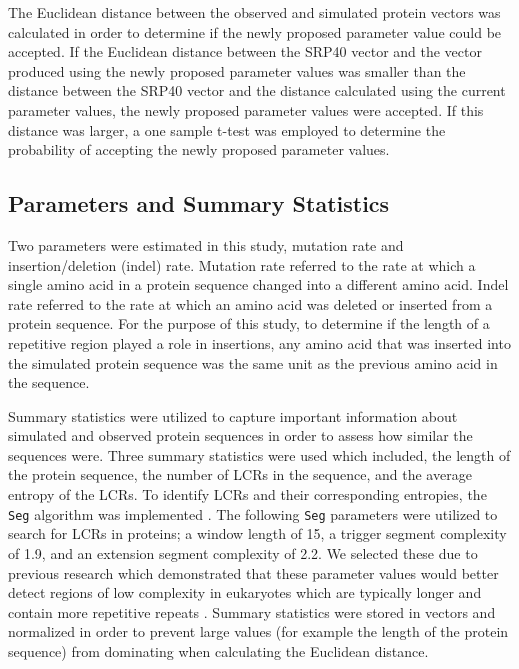 \documentclass[10pt]{article}
\begin{document}
The Euclidean distance between the observed and simulated protein vectors was calculated in order to determine if the newly proposed parameter value could be accepted. If the Euclidean distance between the SRP40 vector and the vector produced using the newly proposed parameter values was smaller than the distance between the SRP40 vector and the distance calculated using the current parameter values, the newly proposed parameter values were accepted. If this distance was larger, a one sample t-test was employed to determine the probability of accepting the newly proposed parameter values.

\subsection{Parameters and Summary Statistics}

Two parameters were estimated in this study, mutation rate and insertion/deletion (indel) rate. Mutation rate referred to the rate at which a single amino acid in a protein sequence changed into a different amino acid. Indel rate referred to the rate at which an amino acid was deleted or inserted from a protein sequence. For the purpose of this study, to determine if the length of a repetitive region played a role in insertions, any amino acid that was inserted into the simulated protein sequence was the same unit as the previous amino acid in the sequence.

Summary statistics were utilized to capture important information about simulated and observed protein sequences in order to assess how similar the sequences were. Three summary statistics were used which included, the length of the protein sequence, the number of LCRs in the sequence, and the average entropy of the LCRs. To identify LCRs and their corresponding entropies, the \texttt{Seg} algorithm was implemented \citep{wootton1993statistics}. The following \texttt{Seg} parameters were utilized to search for LCRs in proteins; a window length of 15, a trigger segment complexity of 1.9, and an extension segment complexity of 2.2. We selected these due to previous research which demonstrated that these parameter values would better detect regions of low complexity in eukaryotes which are typically longer and contain more repetitive repeats \citep{huntley2000evolution}. Summary statistics were stored in vectors and normalized in order to prevent large values (for example the length of the protein sequence) from dominating when calculating the Euclidean distance.
\end{document}
